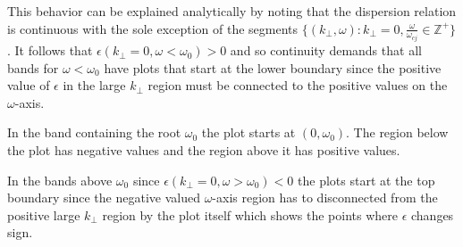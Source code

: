 \documentclass[12pt,a4paper]{article}
\begin{document}
    This behavior can be explained analytically by noting that the dispersion relation is continuous with the sole exception of the segments $\{(k_\perp, \omega): k_\perp = 0, \frac{\omega}{\omega_{cj}} \in \mathbb{Z}^+\}$.
    It follows that $\epsilon(k_\perp = 0, \omega < \omega_0) > 0$ and so continuity demands that all bands for $\omega < \omega_0$ have plots that start at the lower boundary since the positive value of $\epsilon$ in the large $k_\perp$ region must be connected to the positive values on the $\omega$-axis.

    In the band containing the root $\omega_0$ the plot starts at $(0, \omega_0)$. The region below the plot has negative values and the region above it has positive values.

    In the bands above $\omega_0$ since $\epsilon(k_\perp = 0, \omega > \omega_0) < 0$ the plots start at the top boundary since the negative valued $\omega$-axis region has to disconnected from the positive large $k_\perp$ region by the plot itself which shows the points where $\epsilon$ changes sign.
\end{document}
